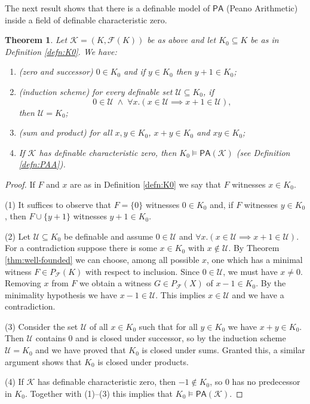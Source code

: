 \documentclass{amsart}
\newcommand{\ca}{\mathcal}
\newcommand{\nin}{\not \in}
\theoremstyle{plain}
\newtheorem{thm}{Theorem}[section]
\theoremstyle{definition}
\newcommand{\F}{\mathcal{F}}
\newcommand{\pF}{P_{\ca F}}
\newcommand{\PA}{\mathsf{PA}}
\begin{document}
 The next result shows that there is a definable model of $\PA$ (Peano Arithmetic) inside a field of definable characteristic zero. 
 
\begin{thm}\label{thm:PA} Let $\ca K = (K, \F(K))$ be as above and let $K_0\subseteq K$ be as in Definition \ref{defn:K0}. We have: 
\begin{enumerate}
\item (zero and successor)	
$0\in K_0$ and if $y\in K_0$ then $y+1\in K_0$;
\item (induction scheme) for every definable set $\ca U\subseteq K_0$, if $$0 \in \ca U \; \land \; \forall x. (x \in  \ca U \implies x+1 \in \ca U),$$ then $\ca U = K_0$;
\item (sum and product) for all $x,y\in K_0$, $x+y\in K_0$ and $xy\in K_0$;
\item If  $\ca K$ has definable characteristic zero, then $K_0 \models \PA(\ca K)$ (see Definition \ref{defn:PAA}). 
\end{enumerate}	
\end{thm}
\begin{proof}
If $F$ and $x$ are as in Definition \ref{defn:K0} we say that $F$ witnesses $x\in K_0$. 

(1) It suffices to observe that $F = \{0\}$ witnesses $0\in K_0$ and, 
if $F$ witnesses $y\in K_0$, then $F\cup \{y+1\}$ witnesses $y+1\in K_0$. 

  (2) Let $\ca U \subseteq K_0$ be definable and assume $0\in \ca U$ and $\forall x. (x \in \ca U \implies x+1 \in \ca U)$. For a contradiction suppose there is some $x\in K_0$ with $x\nin \ca U$. By Theorem \ref{thm:well-founded} we can choose, among all possible $x$, one which has a minimal witness $F\in \pF(K)$ with respect to inclusion. Since $0\in \ca U$, we must have $x\neq 0$. Removing $x$ from $F$ we obtain a witness $G\in \pF(X)$ of $x-1 \in K_0$. By the minimality hypothesis we have $x-1\in \ca U$. This implies $x\in \ca U$ and we have a contradiction. 

(3) Consider the set $\ca U$ of all $x\in K_0$ such that for all $y\in K_0$ we have $x+y\in K_0$. Then $\ca U$ contains $0$ and is closed under successor, so by the induction scheme $\ca U = K_0$ and we have proved that $K_0$ is closed under sums. Granted this, a similar argument shows that $K_0$ is closed under products. 

(4) If $\ca K$ has definable characteristic zero, then $-1\nin K_0$, so $0$ has no predecessor in $K_0$. Together with (1)--(3) this implies that $K_0\models \PA(\ca K)$.
\end{proof}
\end{document}
